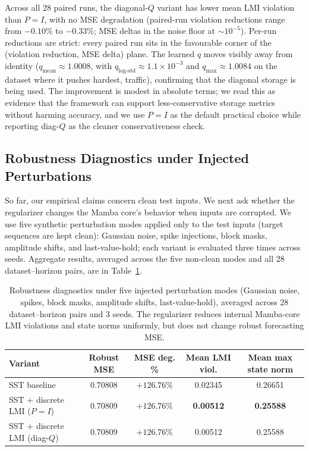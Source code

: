 \documentclass[10pt]{article} %
\theoremstyle{definition}
\begin{document}
Across all 28 paired runs, the diagonal-$Q$ variant has lower mean LMI violation than $P=I$, with no MSE degradation (paired-run violation reductions range from $-0.10\%$ to $-0.33\%$; MSE deltas in the noise floor at $\sim 10^{-5}$). Per-run reductions are strict: every paired run sits in the favourable corner of the (violation reduction, MSE delta) plane. The learned $q$ moves visibly away from identity ($q_{\text{mean}}\approx 1.0008$, with $q_{\text{log-std}}\approx 1.1\times 10^{-3}$ and $q_{\text{max}}\approx 1.0084$ on the dataset where it pushes hardest, traffic), confirming that the diagonal storage is being used. The improvement is modest in absolute terms; we read this as evidence that the framework can support less-conservative storage metrics without harming accuracy, and we use $P=I$ as the default practical choice while reporting diag-$Q$ as the cleaner conservativeness check.

\subsection{Robustness Diagnostics under Injected Perturbations}
\label{subsec:robustness}

So far, our empirical claims concern clean test inputs. We next ask whether the regularizer changes the Mamba core's behavior when inputs are corrupted. We use five synthetic perturbation modes applied only to the test inputs (target sequences are kept clean): Gaussian noise, spike injections, block masks, amplitude shifts, and last-value-hold; each variant is evaluated three times across seeds. Aggregate results, averaged across the five non-clean modes and all 28 dataset--horizon pairs, are in Table~\ref{tab:robust}.

\begin{table}[h]
\centering
\small
\begin{tabular}{l c c c c}
\toprule
\textbf{Variant} & \textbf{Robust MSE} & \textbf{MSE deg. \%} & \textbf{Mean LMI viol.} & \textbf{Mean max state norm}\\
\midrule
SST baseline                  & 0.70808 & $+126.76\%$ & 0.02345 & 0.26651\\
SST + discrete LMI ($P=I$)    & 0.70809 & $+126.76\%$ & \textbf{0.00512} & \textbf{0.25588}\\
SST + discrete LMI (diag-$Q$) & 0.70809 & $+126.76\%$ & 0.00512 & 0.25588\\
\bottomrule
\end{tabular}
\caption{Robustness diagnostics under five injected perturbation modes (Gaussian noise, spikes, block masks, amplitude shifts, last-value-hold), averaged across $28$ dataset--horizon pairs and $3$ seeds. The regularizer reduces internal Mamba-core LMI violations and state norms uniformly, but does not change robust forecasting MSE.}
\label{tab:robust}
\end{table}
\end{document}
